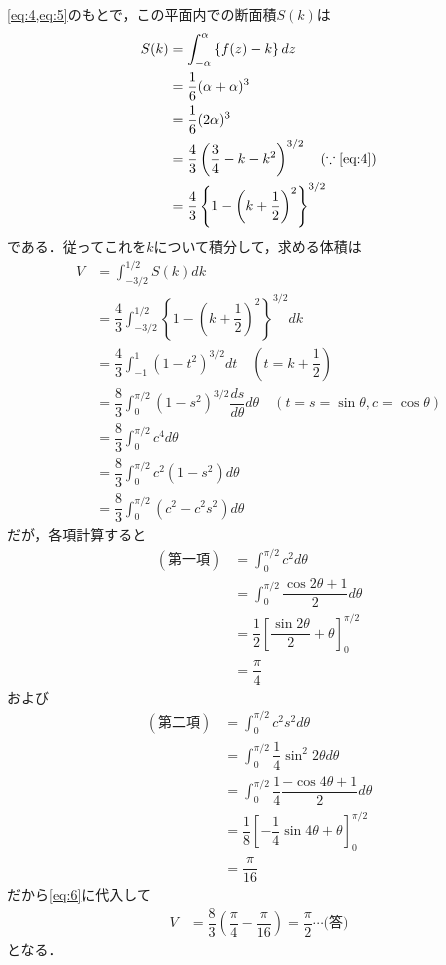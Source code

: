 \documentclass[../../main.tex]{subfiles}
\begin{document}
\cref{eq:4,eq:5}のもとで，この平面内での断面積$S(k)$は
\begin{align}
  S(k)
  &=\int_{-\alpha}^\alpha \left\{ f(z)-k\right\}dz \\
  &=\dfrac{1}{6}(\alpha+\alpha)^3 \\
  &=\dfrac{1}{6}(2\alpha)^3 \\
  &=\dfrac{4}{3}\left(\dfrac{3}{4}-k-k^2\right)^{3/2} \quad (\because \text{\cref{eq:4}})\\
  &=\dfrac{4}{3}\left\{1-\left(k+\dfrac{1}{2}\right)^2\right\}^{3/2}
\end{align}
である．従ってこれを$k$について積分して，求める体積は
\begin{align}
  V
  &=\int_{-3/2}^{1/2}S(k)dk \\
  &=\dfrac{4}{3}\int_{-3/2}^{1/2}\left\{1-\left(k+\dfrac{1}{2}\right)^2\right\}^{3/2}dk \\
  &=\dfrac{4}{3}\int_{-1}^{1}\left(1-t^2\right)^{3/2}dt \quad \left(t=k+\dfrac{1}{2}\right) \\
  &=\dfrac{8}{3}\int_0^{\pi/2}\left(1-s^2\right)^{3/2}\dfrac{ds}{d\theta}d\theta
  \quad \left(t=s=\sin\theta,c=\cos\theta\right) \\
  &=\dfrac{8}{3}\int_0^{\pi/2}c^4 d\theta \\
  &=\dfrac{8}{3}\int_0^{\pi/2}c^2(1-s^2) d\theta \\
  &=\dfrac{8}{3}\int_0^{\pi/2}\left(c^2-c^2s^2\right) d\theta  \label{eq:6}
\end{align}
だが，各項計算すると
\begin{align}
  (\text{第一項})
  &= \int_0^{\pi/2}c^2d\theta \\
  &= \int_0^{\pi/2}\dfrac{\cos 2\theta+1}{2} d\theta\\
  &= \dfrac{1}{2}\left[\dfrac{\sin 2\theta}{2}+\theta\right]_{0}^{\pi/2} \\
  &= \dfrac{\pi}{4}
\end{align}
および
\begin{align}
  (\text{第二項})
  &= \int_0^{\pi/2} c^2s^2 d\theta \\
  &= \int_0^{\pi/2} \dfrac{1}{4}\sin^2 2\theta d\theta \\
  &= \int_0^{\pi/2} \dfrac{1}{4}\dfrac{-\cos 4\theta+1}{2} d\theta \\
  &= \dfrac{1}{8}\left[-\dfrac{1}{4}\sin 4\theta+\theta\right]_{0}^{\pi/2} \\
  &= \dfrac{\pi}{16}
\end{align}
だから\cref{eq:6}に代入して
\begin{align}
  V &= \dfrac{8}{3}\left(\dfrac{\pi}{4}-\dfrac{\pi}{16}\right) = \dfrac{\pi}{2} \cdots\text{(答)}
\end{align}
となる．
\end{document}
